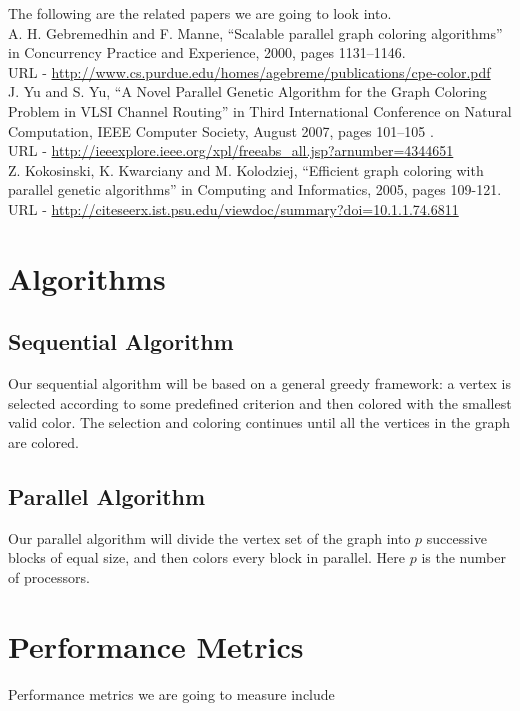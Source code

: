 \documentclass[10pt]{article}
\begin{document}
The following are the related papers we are going to look into.
~\\

A. H. Gebremedhin and F. Manne, ``Scalable parallel graph coloring algorithms'' in Concurrency Practice and Experience, 2000, pages 1131--1146.\\
URL - \href{http://www.cs.purdue.edu/homes/agebreme/publications/cpe-color.pdf}{http://www.cs.purdue.edu/homes/agebreme/publications/cpe-color.pdf}
~\\

J. Yu and S. Yu, ``A Novel Parallel Genetic Algorithm for the Graph Coloring Problem in VLSI Channel Routing'' in Third International Conference on Natural Computation, IEEE Computer Society, August 2007, pages 101--105 .\\
URL - \href{http://ieeexplore.ieee.org/xpl/freeabs\_all.jsp?arnumber=4344651}{http://ieeexplore.ieee.org/xpl/freeabs\_all.jsp?arnumber=4344651}
~\\

Z. Kokosinski, K. Kwarciany and M. Kolodziej, ``Efficient graph coloring with parallel genetic algorithms'' in Computing and Informatics, 2005, pages 109-121.\\
URL - \href{http://citeseerx.ist.psu.edu/viewdoc/summary?doi=10.1.1.74.6811}{http://citeseerx.ist.psu.edu/viewdoc/summary?doi=10.1.1.74.6811}
\section{Algorithms}
\subsection{Sequential Algorithm}
Our sequential algorithm will be based on a general greedy framework: a vertex is selected according to some predefined criterion and then colored with the smallest valid color. The selection and coloring continues until all the vertices in the graph are colored.
\subsection{Parallel Algorithm}
Our parallel algorithm will divide the vertex set of the graph into $p$ successive blocks of equal size, and then colors every block in parallel. Here $p$ is the number of processors.
\section{Performance Metrics}
Performance metrics we are going to measure include
\end{document}

